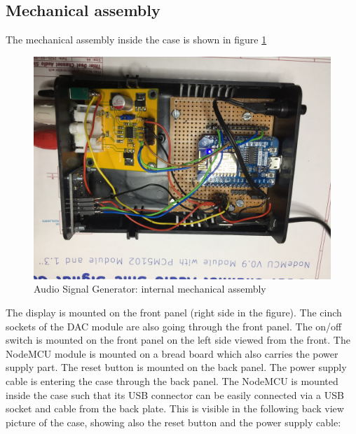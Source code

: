 \documentclass[11pt, oneside]{scrartcl}   	%
\begin{document}
\subsection{Mechanical assembly}
The mechanical assembly inside the case is shown in figure \ref{fig:mechanics}
\begin{figure}[tbph]
	\centering
	\includegraphics[width=\linewidth]{AudioSignalGeneratorTopViewOpened2.jpeg}
	\caption[Audio Signal Generator: internal mechanical assembly]{Audio Signal Generator: internal mechanical assembly}
	\label{fig:mechanics}
\end{figure}
The display is mounted on the front panel (right side in the figure). The cinch sockets of the DAC module are also going through the front panel. The on/off switch is mounted on the front panel on the left side viewed from the front.
The NodeMCU module is mounted on a bread board which also carries the power supply part. The reset button is mounted on the back panel. The power supply cable is entering the case through the back panel.
The NodeMCU is mounted inside the case such that its USB connector can be easily connected via a USB socket and cable
from the back plate. This is visible in the following back view picture of the case, showing also the reset button and the power supply cable:
\end{document}
